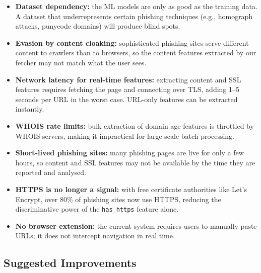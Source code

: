 \documentclass[11pt,a4paper]{article}
\begin{document}
\begin{itemize}
  \item \textbf{Dataset dependency:} the ML models are only as good as the training data. A dataset that underrepresents certain phishing techniques (e.g., homograph attacks, punycode domains) will produce blind spots.
  \item \textbf{Evasion by content cloaking:} sophisticated phishing sites serve different content to crawlers than to browsers, so the content features extracted by our fetcher may not match what the user sees.
  \item \textbf{Network latency for real-time features:} extracting content and SSL features requires fetching the page and connecting over TLS, adding 1--5 seconds per URL in the worst case. URL-only features can be extracted instantly.
  \item \textbf{WHOIS rate limits:} bulk extraction of domain age features is throttled by WHOIS servers, making it impractical for large-scale batch processing.
  \item \textbf{Short-lived phishing sites:} many phishing pages are live for only a few hours, so content and SSL features may not be available by the time they are reported and analysed.
  \item \textbf{HTTPS is no longer a signal:} with free certificate authorities like Let's Encrypt, over 80\% of phishing sites now use HTTPS, reducing the discriminative power of the \texttt{has\_https} feature alone.
  \item \textbf{No browser extension:} the current system requires users to manually paste URLs; it does not intercept navigation in real time.
\end{itemize}

\subsection{Suggested Improvements}
\end{document}
